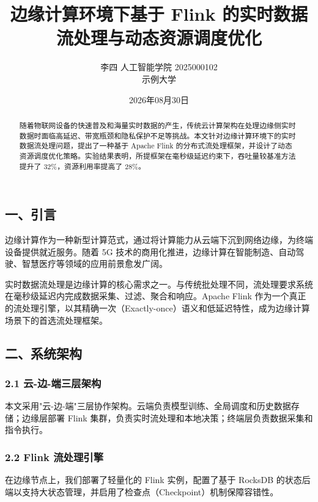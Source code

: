 \documentclass{harryopo-paper}
\title{边缘计算环境下基于 Flink 的实时数据流处理与动态资源调度优化}
\author{李四 人工智能学院 2025000102\\ \fzfs\small 示例大学}
\date{2026年08月30日}
\begin{document}
\maketitle
\begin{abstract}
随着物联网设备的快速普及和海量实时数据的产生，传统云计算架构在处理边缘侧实时数据时面临高延迟、带宽瓶颈和隐私保护不足等挑战。本文针对边缘计算环境下的实时数据流处理问题，提出了一种基于 Apache Flink 的分布式流处理框架，并设计了动态资源调度优化策略。实验结果表明，所提框架在毫秒级延迟约束下，吞吐量较基准方法提升了 32\%，资源利用率提高了 28\%。
\end{abstract}

\subsection*{一、引言}

边缘计算作为一种新型计算范式，通过将计算能力从云端下沉到网络边缘，为终端设备提供就近服务。随着 5G 技术的商用化推进，边缘计算在智能制造、自动驾驶、智慧医疗等领域的应用前景愈发广阔。

实时数据流处理是边缘计算的核心需求之一。与传统批处理不同，流处理要求系统在毫秒级延迟内完成数据采集、过滤、聚合和响应。Apache Flink 作为一个真正的流处理引擎，以其精确一次（Exactly-once）语义和低延迟特性，成为边缘计算场景下的首选流处理框架。

\subsection*{二、系统架构}

\subsubsection*{2.1 云-边-端三层架构}

本文采用"云-边-端"三层协作架构。云端负责模型训练、全局调度和历史数据存储；边缘层部署 Flink 集群，负责实时流处理和本地决策；终端层负责数据采集和指令执行。

\subsubsection*{2.2 Flink 流处理引擎}

在边缘节点上，我们部署了轻量化的 Flink 实例，配置了基于 RocksDB 的状态后端以支持大状态管理，并启用了检查点（Checkpoint）机制保障容错性。
\end{document}
